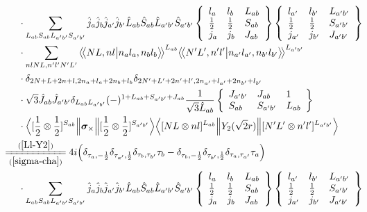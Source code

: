 \documentclass[master]{shnuthesis}
\newcommand{\llangle}{\big\langle\!\big\langle}
\newcommand{\rrangle}{\big\rangle\!\big\rangle}
\newcommand{\ap}{a^\prime}
\newcommand{\bp}{b^\prime}
\newcommand{\il}{\!\!\!\!\!\!\!\!\!\!}
\newcommand{\zdydh}{\xlongequal}
\begin{document}
\begin{align}
    & \cdot \sum_{L_{ab}S_{ab}L_{\ap\bp}S_{\ap\bp}} \hat{j}_a\hat{j}_b\hat{j}_{\ap}\hat{j}_{\bp}\hat{L}_{ab}\hat{S}_{ab}\hat{L}_{\ap\bp}\hat{S}_{\ap\bp}  \left\{\begin{array}{lll}l_{a} & l_{b} & L_{ab} \\ \frac{1}{2} & \frac{1}{2} & S_{ab} \\j_{a} & j_{b} & J_{ab} \end{array}\right\} \left\{\begin{array}{lll}l_{\ap} & l_{\bp} & L_{\ap\bp} \\ \frac{1}{2} & \frac{1}{2} & S_{\ap\bp} \\j_{\ap} & j_{\bp} & J_{\ap\bp} \end{array}\right\}  \notag \\
    & \cdot \sum_{nlNL,n^\prime l^\prime N^\prime L^\prime} \llangle N L, n l \big| n_{a} l_{a}, n_{b} l_{b} \rrangle^{L_{ab}} \llangle N^\prime L^\prime, n^\prime l^\prime \big| n_{a^\prime} l_{a^\prime}, n_{b^\prime} l_{b^\prime} \rrangle^{L_{\ap\bp}} \notag\\
    & \cdot \delta_{2N+L+2n+l,2n_a+l_a+2n_b+l_b}\delta_{2N^\prime+L^\prime+2n^\prime+l^\prime,2n_{a^\prime}+l_{a^\prime}+2n_{b^\prime}+l_{b^\prime}}  \notag\\
    & \cdot \sqrt{3}\hat{J}_{ab}\hat{J}_{\ap\bp} \delta_{L_{ab}L_{\ap\bp}}(-)^{1+L_{ab}+S_{\ap\bp}+J_{ab}}\frac{1}{\sqrt{3}\hat{L}_{ab}}  \left\{\begin{array}{lll} J_{\ap\bp} & J_{ab} & 1 \\ S_{ab} & S_{\ap\bp} & L_{ab} \end{array}\right\}   \notag\\
    & \cdot \Big\langle [\frac{1}{2}\otimes\frac{1}{2}]^{S_{ab}} \Big\| \bm{\sigma}_\times \Big\| [\frac{1}{2}\otimes\frac{1}{2}]^{S_{\ap\bp}} \Big\rangle \Big\langle [N L \otimes n l]^{L_{ab}} \Big\| Y_2(\sqrt{2}r) \Big\| [N^\prime L^\prime \otimes n^\prime l^\prime]^{L_{\ap\bp}} \Big\rangle  \\
    &\il \zdydh[(\ref{sigma-cha})]{(\ref{Ll-Y2})} 4i \Big( \delta_{\tau_a,-\frac{1}{2}}\delta_{\tau_{\ap},\frac{1}{2}}\delta_{\tau_b,\tau_{\bp}}\tau_b - \delta_{\tau_b,-\frac{1}{2}}\delta_{\tau_{\bp},\frac{1}{2}}\delta_{\tau_a,\tau_{\ap}}\tau_a \Big) \notag\\
    & \cdot \sum_{L_{ab}S_{ab}L_{\ap\bp}S_{\ap\bp}} \hat{j}_a\hat{j}_b\hat{j}_{\ap}\hat{j}_{\bp}\hat{L}_{ab}\hat{S}_{ab}\hat{L}_{\ap\bp}\hat{S}_{\ap\bp}  \left\{\begin{array}{lll}l_{a} & l_{b} & L_{ab} \\ \frac{1}{2} & \frac{1}{2} & S_{ab} \\j_{a} & j_{b} & J_{ab} \end{array}\right\} \left\{\begin{array}{lll}l_{\ap} & l_{\bp} & L_{\ap\bp} \\ \frac{1}{2} & \frac{1}{2} & S_{\ap\bp} \\j_{\ap} & j_{\bp} & J_{\ap\bp} \end{array}\right\}  \notag \\

\end{align}
\end{document}
